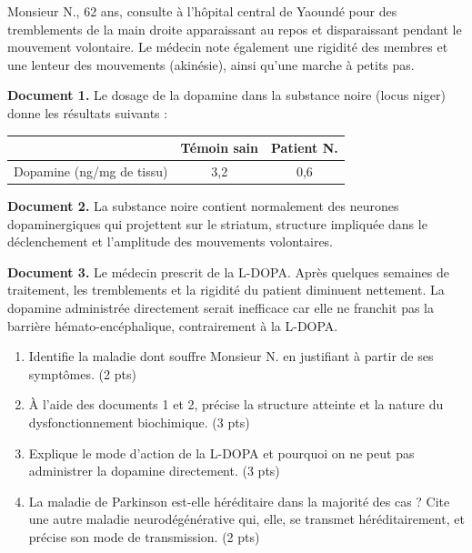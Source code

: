 \documentclass[11pt]{article}
\begin{document}
\begin{exercice}
Monsieur N., 62 ans, consulte à l'hôpital central de Yaoundé pour des tremblements de la main droite apparaissant au repos et disparaissant pendant le mouvement volontaire. Le médecin note également une rigidité des membres et une lenteur des mouvements (akinésie), ainsi qu'une marche à petits pas.

\textbf{Document 1.} Le dosage de la dopamine dans la substance noire (locus niger) donne les résultats suivants :

\begin{center}
\begin{tabular}{|l|c|c|}
\hline
\rowcolor{popblueL} & Témoin sain & Patient N. \\
\hline
Dopamine (ng/mg de tissu) & 3,2 & 0,6 \\
\hline
\end{tabular}
\end{center}

\textbf{Document 2.} La substance noire contient normalement des neurones dopaminergiques qui projettent sur le striatum, structure impliquée dans le déclenchement et l'amplitude des mouvements volontaires.

\textbf{Document 3.} Le médecin prescrit de la L-DOPA. Après quelques semaines de traitement, les tremblements et la rigidité du patient diminuent nettement. La dopamine administrée directement serait inefficace car elle ne franchit pas la barrière hémato-encéphalique, contrairement à la L-DOPA.

\begin{enumerate}
\item Identifie la maladie dont souffre Monsieur N. en justifiant à partir de ses symptômes. (2 pts)
\item À l'aide des documents 1 et 2, précise la structure atteinte et la nature du dysfonctionnement biochimique. (3 pts)
\item Explique le mode d'action de la L-DOPA et pourquoi on ne peut pas administrer la dopamine directement. (3 pts)
\item La maladie de Parkinson est-elle héréditaire dans la majorité des cas ? Cite une autre maladie neurodégénérative qui, elle, se transmet héréditairement, et précise son mode de transmission. (2 pts)
\end{enumerate}
\end{exercice}
\end{document}
